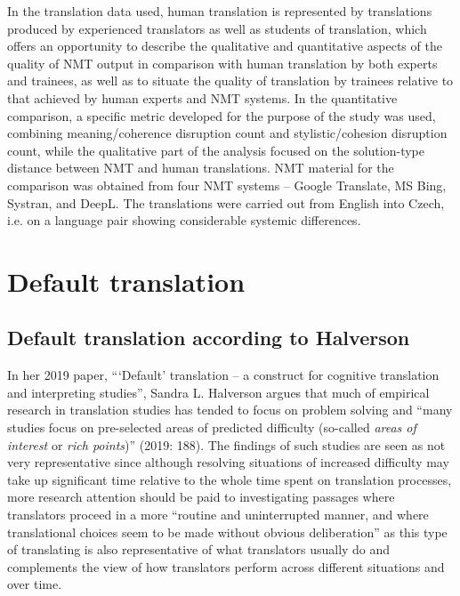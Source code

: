 \documentclass[output=paper]{langscibook}
\begin{document}
In the translation data used, human translation is represented by translations produced by experienced translators as well as students of translation, which offers an opportunity to describe the qualitative and quantitative aspects of the quality of NMT output in comparison with human translation by both experts and trainees, as well as to situate the quality of translation by trainees relative to that achieved by human experts and NMT systems. In the quantitative comparison, a specific metric developed for the purpose of the study was used, combining meaning/coherence disruption count and stylistic/cohesion disruption count, while the qualitative part of the analysis focused on the solution-type distance between NMT and human translations. NMT material for the comparison was obtained from four NMT systems – Google Translate, MS Bing, Systran, and DeepL. The translations were carried out from English into Czech, i.e. on a language pair showing considerable systemic differences.

\section{Default translation}\label{sec:kamenicka:2}

\subsection{Default translation according to Halverson}\label{sec:kamenicka:2.1}

In her 2019 paper, “‘Default’ translation – a construct for cognitive translation and interpreting studies”, Sandra L. Halverson argues that much of empirical research in translation studies has tended to focus on problem solving and “many studies focus on pre-selected areas of predicted difficulty (so-called \textit{areas of interest} or \textit{rich points})” (2019: 188). The findings of such studies are seen as not very representative since although resolving situations of increased difficulty may take up significant time relative to the whole time spent on translation processes, more research attention should be paid to investigating passages where translators proceed in a more “routine and uninterrupted manner, and where translational choices seem to be made without obvious deliberation” \citep[188]{Halverson2019} as this type of translating is also representative of what translators usually do and complements the view of how translators perform across different situations and over time.
\end{document}
